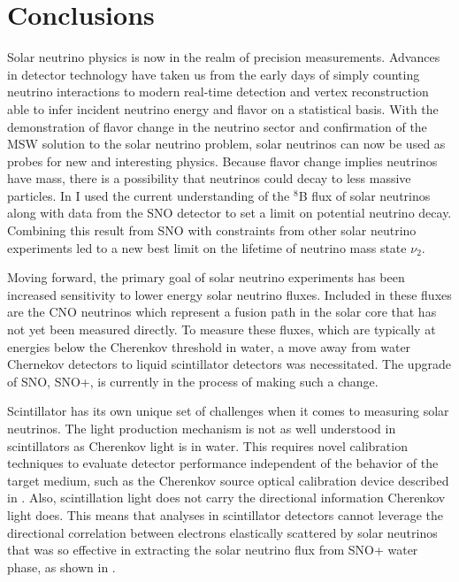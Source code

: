 \chapter{Conclusions}

Solar neutrino physics is now in the realm of precision measurements.
Advances in detector technology have taken us from the early days of simply counting neutrino interactions to modern real-time detection and vertex reconstruction able to infer incident neutrino energy and flavor on a statistical basis.
With the demonstration of flavor change in the neutrino sector and confirmation of the MSW solution to the solar neutrino problem, solar neutrinos can now be used as probes for new and interesting physics.
Because flavor change implies neutrinos have mass, there is a possibility that neutrinos could decay to less massive particles.
In  I used the current understanding of the $^8$B flux of solar neutrinos along with data from the SNO detector to set a limit on potential neutrino decay.
Combining this result from SNO with constraints from other solar neutrino experiments led to a new best limit on the lifetime of neutrino mass state $\nu_2$.

Moving forward, the primary goal of solar neutrino experiments has been increased sensitivity to lower energy solar neutrino fluxes.
Included in these fluxes are the CNO neutrinos which represent a fusion path in the solar core that has not yet been measured directly.
To measure these fluxes, which are typically at energies below the Cherenkov threshold in water, a move away from water Chernekov detectors to liquid scintillator detectors was necessitated.
The upgrade of SNO, SNO+, is currently in the process of making such a change.

Scintillator has its own unique set of challenges when it comes to measuring solar neutrinos.
The light production mechanism is not as well understood in scintillators as Cherenkov light is in water.
This requires novel calibration techniques to evaluate detector performance independent of the behavior of the target medium, such as the Cherenkov source optical calibration device described in .
Also, scintillation light does not carry the directional information Cherenkov light does.
This means that analyses in scintillator detectors cannot leverage the directional correlation between electrons elastically scattered by solar neutrinos that was so effective in extracting the solar neutrino flux from SNO+ water phase, as shown in .

